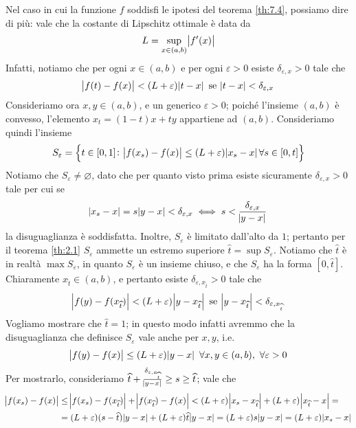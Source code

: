 \begin{remark}
    Nel caso in cui la funzione $f$ soddisfi le ipotesi del teorema \ref{th:7.4}, possiamo dire di più: vale che la costante di Lipschitz ottimale è data da
    \[
    L = \sup_{x\in(a,b)} \abs{f'(x)}
    \]
    Infatti, notiamo che per ogni $x\in(a,b)$ e per ogni $\varepsilon>0$ esiste $\delta_{\varepsilon, x}>0$ tale che
    \[
    \abs{f(t)-f(x)}< (L+\varepsilon) \abs{t-x} \ \text{se} \ \abs{t-x}<\delta_{\varepsilon, x}
    \]
    Consideriamo ora $x,y\in(a,b)$, e un generico $\varepsilon>0$; poiché l'insieme $(a,b)$ è convesso, l'elemento $x_t = (1-t)x+ty$ appartiene ad $(a,b)$. Consideriamo quindi l'insieme
    \[
    S_\varepsilon = \left\{t\in[0, 1] \colon \abs{f(x_s)-f(x)}\le(L+\varepsilon)\abs{x_s-x} \forall s\in[0,t]\right\}
    \]
    Notiamo che $S_\varepsilon\ne \varnothing$, dato che per quanto visto prima esiste sicuramente $\delta_{\varepsilon,x}>0$ tale per cui se 
    \[
    \abs{x_s-x}=s\abs{y-x}<\delta_{\varepsilon,x} \iff s<\frac{\delta_{\varepsilon,x}}{\abs{y-x}}
    \]
    la disuguaglianza è soddisfatta. Inoltre, $S_\varepsilon$ è limitato dall'alto da $1$; pertanto per il teorema \ref{th:2.1} $S_\varepsilon$ ammette un estremo superiore $\widehat{t} = \sup S_{\varepsilon}$. Notiamo che $\widehat{t}$ è in realtà $\max S_\varepsilon$, in quanto $S_\varepsilon$ è un insieme chiuso, e che $S_\varepsilon$ ha la forma $[0, \widehat{t}]$.\\
    Chiaramente $x_{\widehat{t}}\in(a,b)$, e pertanto esiste $\delta_{\varepsilon,x_{\widehat{t}}}>0$ tale che
    \[
    \abs{f(y)-f(x_{\widehat{t}})}<(L+\varepsilon)\abs{y-x_{\widehat{t}}} \ \text{se} \ \abs{y-x_{\widehat{t}}}<\delta_{\varepsilon, x_{\widehat{t}}}
    \]
    Vogliamo mostrare che $\widehat{t}=1$; in questo modo infatti avremmo che la disuguaglianza che definisce $S_\varepsilon$ vale anche per $x,y$, i.e.
    \[
    \abs{f(y)-f(x)}\le (L+\varepsilon)\abs{y-x} \ \forall x,y\in(a,b), \ \forall \varepsilon>0
    \]
    Per mostrarlo, consideriamo $\widehat{t} + \frac{\delta_{\varepsilon, x_{\widehat{t}}}}{\abs{y-x}}\ge s\ge \widehat{t}$; vale che
    \[
    \begin{split}
        \abs{f(x_s)-f(x)} & \le \abs{f(x_s) - f(x_{\widehat{t}})} + \abs{f(x_{\widehat{t}})-f(x)} < (L+\varepsilon) \abs{x_s-x_{\widehat{t}}} + (L+\varepsilon)\abs{x_{\widehat{t}}-x} = \\
        & = (L+\varepsilon)(s-\widehat{t})\abs{y-x} + (L+\varepsilon)\widehat{t}\abs{y-x} = (L+\varepsilon)s\abs{y-x} = (L+\varepsilon)\abs{x_s-x}
    \end{split}
\]
\end{remark}
